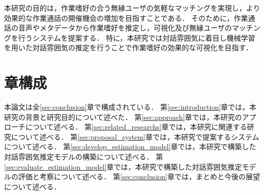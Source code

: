 本研究の目的は，作業嗜好の合う無縁ユーザの気軽なマッチングを実現し，より効果的な作業通話の開催機会の増加を目指すことである．
そのために，作業通話の音声やメタデータから作業嗜好を推定し，可視化及び無縁ユーザのマッチングを行うシステムを提案する．
特に，本研究では対話雰囲気に着目し機械学習を用いた対話雰囲気の推定を行うことで作業嗜好の効果的な可視化を目指す．

\section{章構成}

本論文は全\ref{sec:conclusion}章で構成されている．
第\ref{sec:introduction}章では，本研究の背景と研究目的について述べた．
第\ref{sec:approach}章では，本研究のアプローチについて述べる．
第\ref{sec:related_researchs}章では，本研究に関連する研究について述べる．
第\ref{sec:proposal_system}章では，本研究で提案するシステムについて述べる．
第\ref{sec:develop_estimation_model}章では，本研究で構築した対話雰囲気推定モデルの構築について述べる．
第\ref{sec:evaluate_estimation_model}章では，本研究で構築した対話雰囲気推定モデルの評価と考察について述べる．
第\ref{sec:conclusion}章では，まとめと今後の展望について述べる．
